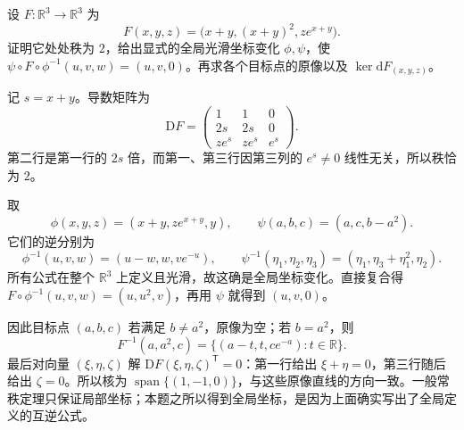 \begin{exercise}
	\label{g1:ex:rank-two-explicit-coordinates}
	设 \(F:\mathbb R^3\to\mathbb R^3\) 为
	\[
		F(x,y,z)=\bigl(x+y,(x+y)^2,ze^{x+y}\bigr).
	\]
	证明它处处秩为 \(2\)，给出显式的全局光滑坐标变化 \(\phi,\psi\)，使 \(\psi\circ F\circ\phi^{-1}(u,v,w)=(u,v,0)\)。再求各个目标点的原像以及 \(\ker\mathrm{d}F_{(x,y,z)}\)。
\end{exercise}
\begin{solution}
	记 \(s=x+y\)。导数矩阵为
	\[
		\mathrm{D}F=\begin{pmatrix}
			1&1&0\\
			2s&2s&0\\
			ze^s&ze^s&e^s
		\end{pmatrix}.
	\]
	第二行是第一行的 \(2s\) 倍，而第一、第三行因第三列的 \(e^s\ne0\) 线性无关，所以秩恰为 \(2\)。

	取
	\[
		\phi(x,y,z)=(x+y,ze^{x+y},y),\qquad
		\psi(a,b,c)=(a,c,b-a^2).
	\]
	它们的逆分别为
	\[
		\phi^{-1}(u,v,w)=(u-w,w,ve^{-u}),\qquad
		\psi^{-1}(\eta_1,\eta_2,\eta_3)
		=(\eta_1,\eta_3+\eta_1^2,\eta_2).
	\]
	所有公式在整个 \(\mathbb R^3\) 上定义且光滑，故这确是全局坐标变化。直接复合得 \(F\circ\phi^{-1}(u,v,w)=(u,u^2,v)\)，再用 \(\psi\) 就得到 \((u,v,0)\)。

	因此目标点 \((a,b,c)\) 若满足 \(b\ne a^2\)，原像为空；若 \(b=a^2\)，则
	\[
		F^{-1}(a,a^2,c)=\{(a-t,t,ce^{-a}):t\in\mathbb R\}.
	\]
	最后对向量 \((\xi,\eta,\zeta)\) 解 \(\mathrm{D}F(\xi,\eta,\zeta)^{\mathsf T}=0\)：第一行给出 \(\xi+\eta=0\)，第三行随后给出 \(\zeta=0\)。所以核为 \(\operatorname{span}\{(1,-1,0)\}\)，与这些原像直线的方向一致。一般常秩定理只保证局部坐标；本题之所以得到全局坐标，是因为上面确实写出了全局定义的互逆公式。
\end{solution}

